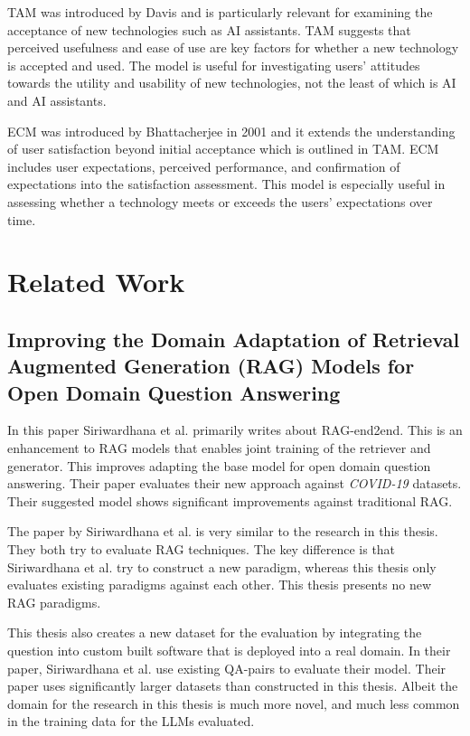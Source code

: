 \gls{TAM} was introduced by Davis \cite{davis_perceived_1989} and is particularly relevant for examining the acceptance of new technologies such as AI assistants. \gls{TAM} suggests that perceived usefulness and ease of use are key factors for whether a new technology is accepted and used. The model is useful for investigating users' attitudes towards the utility and usability of new technologies, not the least of which is AI and AI assistants.


\gls{ECM} was introduced by Bhattacherjee \cite{bhattacherjee_understanding_2001} in 2001 and it extends the understanding of user satisfaction beyond initial acceptance which is outlined in \gls{TAM}. \gls{ECM} includes user expectations, perceived performance, and confirmation of expectations into the satisfaction assessment. This model is especially useful in assessing whether a technology meets or exceeds the users' expectations over time.


\section{Related Work}
\label{sec:related_work}


\subsection{Improving the Domain Adaptation of Retrieval Augmented Generation (RAG) Models for Open Domain Question Answering}


In this paper Siriwardhana et al. \cite{siriwardhana_improving_2023} primarily writes about \gls{RAG}-end2end. This is an enhancement to \gls{RAG} models that enables joint training of the retriever and generator. This improves adapting the base model for open domain question answering. Their paper evaluates their new approach against \textit{COVID-19} datasets. Their suggested model shows significant improvements against traditional \gls{RAG}.


The paper by Siriwardhana et al. is very similar to the research in this thesis. They both try to evaluate \gls{RAG} techniques. The key difference is that Siriwardhana et al. try to construct a new paradigm, whereas this thesis only evaluates existing paradigms against each other. This thesis presents no new \gls{RAG} paradigms.


This thesis also creates a new dataset for the evaluation by integrating the question into custom built software that is deployed into a real domain. In their paper, Siriwardhana et al. use existing QA-pairs to evaluate their model. Their paper uses significantly larger datasets than constructed in this thesis. Albeit the domain for the research in this thesis is much more novel, and much less common in the training data for the \gls{LLM}s evaluated.


